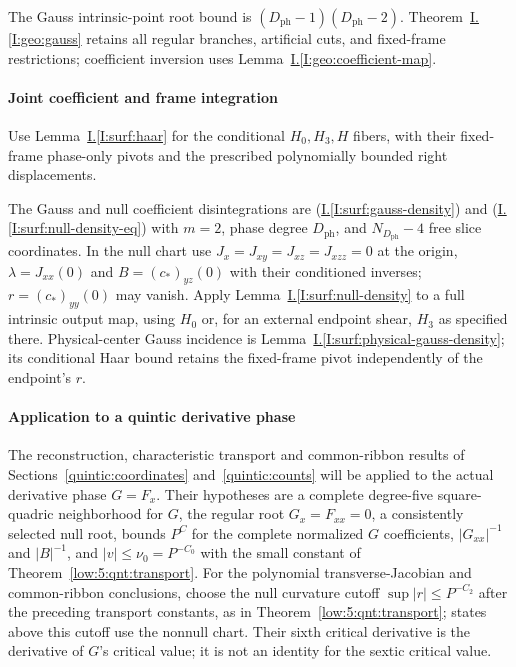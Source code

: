 \documentclass[11pt]{amsart}
\theoremstyle{definition}
\theoremstyle{remark}
\numberwithin{equation}{section}
\newcommand{\partIref}[1]{\hyperref[I:#1]{I.\ref*{I:#1}}}
\newcommand{\partIeqref}[1]{\textup{(\partIref{#1})}}
\begin{document}
The Gauss intrinsic-point root bound is $(D_{\mathrm{ph}}-1)(D_{\mathrm{ph}}-2)$. Theorem~\partIref{geo:gauss} retains all regular branches, artificial cuts, and fixed-frame restrictions; coefficient inversion uses Lemma~\partIref{geo:coefficient-map}.

\paragraph{Joint coefficient and frame integration}
Use Lemma~\partIref{surf:haar} for the conditional $H_0,H_3,H$ fibers, with their fixed-frame phase-only pivots and the prescribed polynomially bounded right displacements.

The Gauss and null coefficient disintegrations are \partIeqref{surf:gauss-density} and \partIeqref{surf:null-density-eq} with $m=2$, phase degree $D_{\mathrm{ph}}$, and $N_{D_{\mathrm{ph}}}-4$ free slice coordinates. In the null chart use $J_x=J_{xy}=J_{xz}=J_{xzz}=0$ at the origin, $\lambda=J_{xx}(0)$ and $B=(c_*)_{yz}(0)$ with their conditioned inverses; $r=(c_*)_{yy}(0)$ may vanish. Apply Lemma~\partIref{surf:null-density} to a full intrinsic output map, using $H_0$ or, for an external endpoint shear, $H_3$ as specified there. Physical-center Gauss incidence is Lemma~\partIref{surf:physical-gauss-density}; its conditional Haar bound retains the fixed-frame pivot independently of the endpoint's $r$.

\paragraph{Application to a quintic derivative phase}
The reconstruction, characteristic transport and common-ribbon results of Sections~\ref{quintic:coordinates} and~\ref{quintic:counts} will be applied to the actual derivative phase $G=F_x$. Their hypotheses are a complete degree-five square-quadric neighborhood for $G$, the regular root $G_x=F_{xx}=0$, a consistently selected null root, bounds $P^C$ for the complete normalized $G$ coefficients, $|G_{xx}|^{-1}$ and $|B|^{-1}$, and $|v|\le\nu_0=P^{-C_0}$ with the small constant of Theorem~\ref{low:5:qnt:transport}. For the polynomial transverse-Jacobian and common-ribbon conclusions, choose the null curvature cutoff $\sup|r|\le P^{-C_2}$ after the preceding transport constants, as in Theorem~\ref{low:5:qnt:transport}; states above this cutoff use the nonnull chart. Their sixth critical derivative is the derivative of $G$'s critical value; it is not an identity for the sextic critical value.
\end{document}
